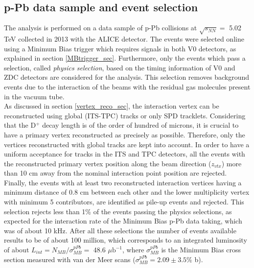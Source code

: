 \documentclass[b5paper,10pt,twoside,oldstyle,classica]{toptesi}
\begin{document}
\subsection{p-Pb data sample and event selection}
\label{datasample}
The analysis is performed on a data sample of p-Pb collisions at $\sqrt{s_{NN}} =$ 5.02 TeV collected in 2013 with the ALICE detector. The events were selected online using a Minimum Bias trigger which requires signals in both V0 detectors, as explained in section \ref{MBtrigger_sec}. Furthermore, only the events which pass a selection, called \textit{physics selection}, based on the timing information of V0 and ZDC detectors are considered for the analysis. This selection removes background events due to the interaction of the beams with the residual gas molecules present in the vacuum tube. \\
As discussed in section \ref{vertex_reco_sec}, the interaction vertex can be reconstructed using global (ITS-TPC) tracks or only SPD tracklets. Considering that the D$^+$ decay length is of the order of hundred of microns, it is crucial to have a primary vertex reconstructed as precisely as possible. Therefore, only the vertices reconstructed with global tracks are kept into account. In order to have a uniform acceptance for tracks in the ITS and TPC detectors, all the events with the reconstructed primary vertex position along the beam direction ($z_{vtx}$) more than 10 cm away from the nominal interaction point position are rejected. Finally, the events with at least two reconstructed interaction vertices having a minimum distance of 0.8 cm between each other and the lower multiplicity vertex with minimum 5 contributors, are identified as pile-up events and rejected. This selection rejects less than 1\% of the events passing the physics selections, as expected for the interaction rate of the Minimum Bias p-Pb data taking, which was of about 10 kHz.
After all these selections the number of events available results to be of about 100 million, which corresponds to an integrated luminosity of about $L_{int} = N_{MB}/\sigma_{MB}^{pPb} =$ 48.6 $\mu \text{b}^{-1}$, where $\sigma_{MB}^{pPb}$ is the Minimum Bias cross section measured with van der Meer scans \cite{Abelev:2014epa} ($\sigma_{MB}^{pPb} = 2.09 \pm 3.5\%$ b).
\end{document}
